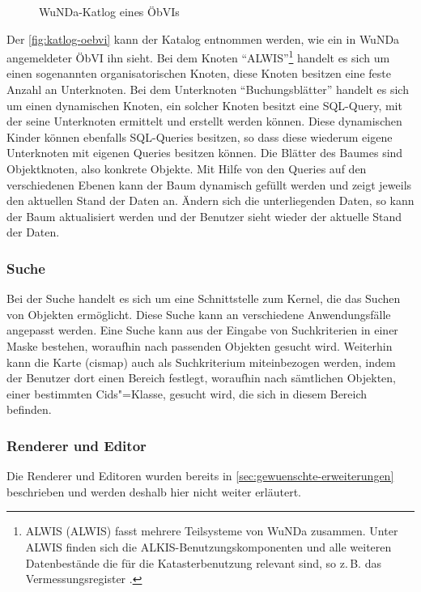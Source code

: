 \begin{figure}[htb]
	\centering
	\caption{WuNDa-Katlog eines ÖbVIs}
	\label{fig:katlog-oebvi}
\end{figure}

Der \autoref{fig:katlog-oebvi} kann der Katalog entnommen werden, wie ein in \ac{WuNDa} angemeldeter \ac{ÖbVI} ihn sieht.
Bei dem Knoten \enquote{\acs{ALWIS}}\footnote{
\acs{ALWIS} (\acl{ALWIS}) fasst mehrere Teilsysteme von \ac{WuNDa} zusammen. Unter \acs{ALWIS} finden sich die ALKIS-Benutzungskomponenten und alle weiteren Datenbestände die für die Katasterbenutzung relevant sind, so z.\,B. das Vermessungsregister \autocite[vgl.][]{wupp-wunda-oebvi}.}
handelt es sich um einen sogenannten organisatorischen Knoten, diese Knoten besitzen eine feste Anzahl an Unterknoten.
Bei dem Unterknoten \enquote{Buchungsblätter} handelt es sich um einen dynamischen Knoten, ein solcher Knoten besitzt eine SQL-Query, mit der seine Unterknoten ermittelt und erstellt werden können.
Diese dynamischen Kinder können ebenfalls SQL-Queries besitzen, so dass diese wiederum eigene Unterknoten mit eigenen Queries besitzen können.
Die Blätter des Baumes sind Objektknoten, also konkrete Objekte.
Mit Hilfe von den Queries auf den verschiedenen Ebenen kann der Baum dynamisch gefüllt werden und zeigt jeweils den aktuellen Stand der Daten an.
Ändern sich die unterliegenden Daten, so kann der Baum aktualisiert werden und der Benutzer sieht wieder der aktuelle Stand der Daten.

\subsubsection{Suche}
Bei der Suche handelt es sich um eine Schnittstelle zum Kernel, die das Suchen von Objekten ermöglicht.
Diese Suche kann an verschiedene Anwendungsfälle angepasst werden.
Eine Suche kann aus der Eingabe von Suchkriterien in einer Maske bestehen, woraufhin nach passenden Objekten gesucht wird.
Weiterhin kann die Karte (cismap) auch als Suchkriterium miteinbezogen werden, indem der Benutzer dort einen Bereich festlegt, woraufhin nach sämtlichen Objekten, einer bestimmten Cids"=Klasse, gesucht wird, die sich in diesem Bereich befinden.

\subsubsection{Renderer und Editor}
Die Renderer und Editoren wurden bereits in \autoref{sec:gewuenschte-erweiterungen} beschrieben und werden deshalb hier nicht weiter erläutert.

